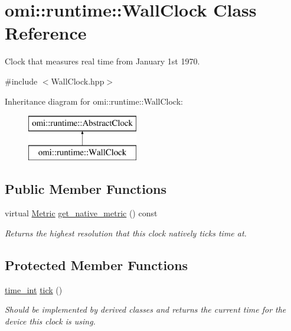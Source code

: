 \hypertarget{classomi_1_1runtime_1_1_wall_clock}{}\section{omi\+:\+:runtime\+:\+:Wall\+Clock Class Reference}
\label{classomi_1_1runtime_1_1_wall_clock}


Clock that measures real time from January 1st 1970.  




{\ttfamily \#include $<$Wall\+Clock.\+hpp$>$}

Inheritance diagram for omi\+:\+:runtime\+:\+:Wall\+Clock\+:\begin{figure}[H]
\begin{center}
\leavevmode
\includegraphics[height=2.000000cm]{classomi_1_1runtime_1_1_wall_clock}
\end{center}
\end{figure}
\subsection*{Public Member Functions}
\begin{DoxyCompactItemize}
\item 
\hypertarget{classomi_1_1runtime_1_1_wall_clock_a275514a3171792b2067eda5cfac9490d}{}virtual \hyperlink{classomi_1_1runtime_1_1_abstract_clock_a6af6e30a02165469ffcdcbd512d47a1b}{Metric} \hyperlink{classomi_1_1runtime_1_1_wall_clock_a275514a3171792b2067eda5cfac9490d}{get\+\_\+native\+\_\+metric} () const \label{classomi_1_1runtime_1_1_wall_clock_a275514a3171792b2067eda5cfac9490d}

\begin{DoxyCompactList}\small\item\em Returns the highest resolution that this clock natively ticks time at. \end{DoxyCompactList}\end{DoxyCompactItemize}
\subsection*{Protected Member Functions}
\begin{DoxyCompactItemize}
\item 
\hyperlink{classomi_1_1runtime_1_1_abstract_clock_af2122541388aea885afc08e8135340f7}{time\+\_\+int} \hyperlink{classomi_1_1runtime_1_1_wall_clock_a3a7252baf0bd82141aeb60e2303fb56a}{tick} ()
\begin{DoxyCompactList}\small\item\em Should be implemented by derived classes and returns the current time for the device this clock is using. \end{DoxyCompactList}\end{DoxyCompactItemize}
